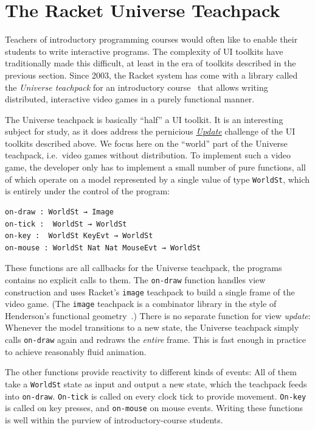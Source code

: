 \documentclass[sigplan,screen]{acmart}
\begin{document}
\section{The Racket Universe Teachpack}
\label{sec:universe-teachpack}

Teachers of introductory programming courses would often like to
enable their students to write interactive programs.  The complexity
of UI toolkits have traditionally made this difficult, at least in the
era of toolkits described in the previous section.  Since 2003, the Racket system
 has come with a library called the \textit{Universe teachpack} for an
introductory course~\cite{UniverseTeachpack} that allows writing
distributed, interactive video games in a purely functional manner.

The Universe teachpack is basically ``half'' a UI toolkit.  It is an
interesting subject for study, as it does address the pernicious \hyperlink{challenge:update}{\textit{Update}}
challenge of the UI toolkits described above.  We focus
here on the ``world'' part of the Universe teachpack, i.e.\ video
games without distribution.  To implement such a video game, the
developer only has to implement a small number of pure functions, all
of which operate on a model represented by
a single value of type \texttt{WorldSt}, which is entirely under the
control of the program:
%
\begin{verbatim}
on-draw : WorldSt → Image
on-tick :  WorldSt → WorldSt
on-key :  WorldSt KeyEvt → WorldSt
on-mouse : WorldSt Nat Nat MouseEvt → WorldSt
\end{verbatim}
%
These functions are all callbacks for the Universe teachpack, the
programs contains no explicit calls to them.
The \texttt{on-draw} function handles view construction and uses Racket's
\texttt{image} teachpack to build a single frame of the video game.
(The \texttt{image} teachpack is a combinator library in the style of
Henderson's functional geometry~\cite{Henderson1982}.)  There is no
separate function for view \emph{update}: Whenever the model
transitions to a new state, the Universe teachpack simply calls
\texttt{on-draw} again and redraws the \emph{entire} frame.  This is
fast enough in practice to achieve reasonably fluid animation.

The other functions provide reactivity to different kinds of events:
All of them take a \texttt{WorldSt} state as input and output a new
state, which the teachpack feeds into \texttt{on-draw}.
\texttt{On-tick} is called on every clock tick to provide movement.
\texttt{On-key} is called on
key presses, and \texttt{on-mouse} on mouse events.  Writing these
functions is well within the purview of introductory-course students.
\end{document}
